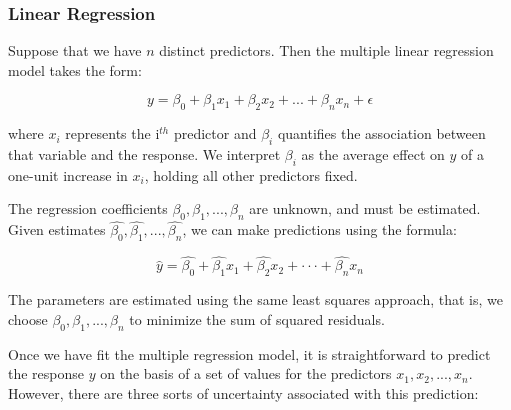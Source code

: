 \subsubsection{Linear Regression}

Suppose that we have $n$ distinct predictors. Then the multiple linear regression model takes the
form:

\begin{equation}
    y = \beta_0 + \beta_1 x_1 + \beta_2 x_2 + ... + \beta_n x_n + \epsilon
\end{equation}

where $x_i$ represents the i$^{th}$ predictor and $\beta_i$ quantifies the association between that
variable and the response. We interpret $\beta_i$ as the average effect on $y$ of a one-unit
increase in $x_i$, holding all other predictors fixed.

The regression coefficients $\beta_0, \beta_1, ..., \beta_n$ are unknown, and must be estimated.
Given estimates $\hat{\beta_0}, \hat{\beta_1}, ..., \hat{\beta_n}$, we can make predictions using
the formula:

\begin{equation}
    \hat{y} = \hat{\beta_0} + \hat{\beta_1} x_1 + \hat{\beta_2} x_2 + ··· + \hat{\beta_n} x_n
\end{equation}

The parameters are estimated using the same least squares approach, that is, we choose $\beta_0,
\beta_1, ..., \beta_n$ to minimize the sum of squared residuals.

Once we have fit the multiple regression model, it is straightforward to predict the response $y$ on
the basis of a set of values for the predictors $x_1, x_2, ..., x_n$. However, there are three sorts
of uncertainty associated with this prediction:

